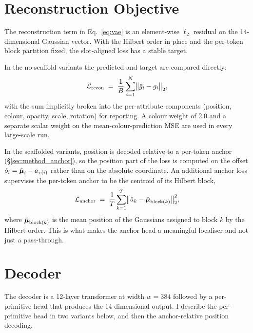 \section{Reconstruction Objective}
\label{sec:method_recon}

The reconstruction term in Eq.~\eqref{eq:vae} is an element-wise $\ell_2$ residual on the 14-dimensional Gaussian vector. With the Hilbert order in place and the per-token block partition fixed, the slot-aligned loss has a stable target.

In the no-scaffold variants the predicted and target are compared directly:
\begin{equation}
\mathcal{L}_{\text{recon}} \;=\; \frac{1}{B}\sum_{i=1}^{N} \bigl\lVert \hat{g}_i - g_i \bigr\rVert_2,
\label{eq:recon_noscaffold}
\end{equation}
with the sum implicitly broken into the per-attribute components (position, colour, opacity, scale, rotation) for reporting. A colour weight of 2.0 and a separate scalar weight on the mean-colour-prediction MSE are used in every large-scale run.

In the scaffolded variants, position is decoded relative to a per-token anchor (\S\ref{sec:method_anchor}), so the position part of the loss is computed on the offset $\hat{o}_i = \hat{\boldsymbol{\mu}}_i - a_{\tau(i)}$ rather than on the absolute coordinate. An additional anchor loss supervises the per-token anchor to be the centroid of its Hilbert block,
\begin{equation}
\mathcal{L}_{\text{anchor}} \;=\; \frac{1}{T}\sum_{k=1}^{T} \bigl\lVert \hat{a}_k - \bar{\boldsymbol{\mu}}_{\text{block}(k)} \bigr\rVert_2^2,
\label{eq:anchor_loss}
\end{equation}
where $\bar{\boldsymbol{\mu}}_{\text{block}(k)}$ is the mean position of the Gaussians assigned to block $k$ by the Hilbert order. This is what makes the anchor head a meaningful localiser and not just a pass-through.

\section{Decoder}
\label{sec:method_decoder}

The decoder is a 12-layer transformer at width $w = 384$ followed by a per-primitive head that produces the 14-dimensional output. I describe the per-primitive head in two variants below, and then the anchor-relative position decoding.

